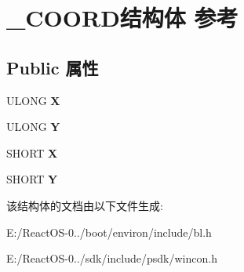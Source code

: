 \hypertarget{struct___c_o_o_r_d}{}\section{\+\_\+\+C\+O\+O\+R\+D结构体 参考}
\label{struct___c_o_o_r_d}
\subsection*{Public 属性}
\begin{DoxyCompactItemize}
\item 
\mbox{\label{struct___c_o_o_r_d_ace38abb7692320638263b8239bc7c4e2}} 
U\+L\+O\+NG {\bfseries X}
\item 
\mbox{\label{struct___c_o_o_r_d_a3646472c3b49befd6bb9fb6d943962a9}} 
U\+L\+O\+NG {\bfseries Y}
\item 
\mbox{\label{struct___c_o_o_r_d_aa6a8a742dfd82136de4207df448a72e0}} 
S\+H\+O\+RT {\bfseries X}
\item 
\mbox{\label{struct___c_o_o_r_d_a2d586bb8b28b33b975d5069e70a058c2}} 
S\+H\+O\+RT {\bfseries Y}
\end{DoxyCompactItemize}


该结构体的文档由以下文件生成\+:\begin{DoxyCompactItemize}
\item 
E\+:/\+React\+O\+S-\/0../boot/environ/include/bl.\+h\item 
E\+:/\+React\+O\+S-\/0../sdk/include/psdk/wincon.\+h\end{DoxyCompactItemize}
